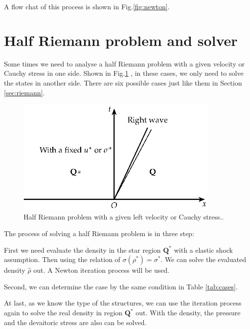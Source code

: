\documentclass[review]{elsarticle}
\begin{document}
A flow chat of this process is shown in Fig.\ref{fig:newton}.
\section{Half Riemann problem and  solver}
Some times we need to analyse a half Riemann problem with a given velocity or Cauchy stress in one side. Shown in Fig.\ref{fig:half} , in these cases, we only need to solve the states in another side. There are six possible cases just like them in Section \ref{sec:riemann}.

\begin{figure}
  \centering
  \includegraphics[width= 10cm] {Tikz-figure8.eps}
  \caption{Half Riemann problem  with a given left velocity or Cauchy stress..}
  \label{fig:half}
\end{figure}

The process of solving a half Riemann problem is in three step:

First we need evaluate the density in the star region $\mathbf{Q}^*$ with a  elastic shock assumption.  Then using the relation of $\sigma(\rho^*) = \sigma^*$. We can solve the evaluated density $\hat{\rho}$ out. A  Newton iteration process will be used.

Second, we can determine the case by the same condition in Table \ref{tab:cases}. 

At last, as we know the type of the structures, we can use the  iteration process again to solve the real density in region $\mathbf{Q}^*$ out. With the density, the pressure and the devaitoric stress are also can be solved. 

\subsection{}
\end{document}
